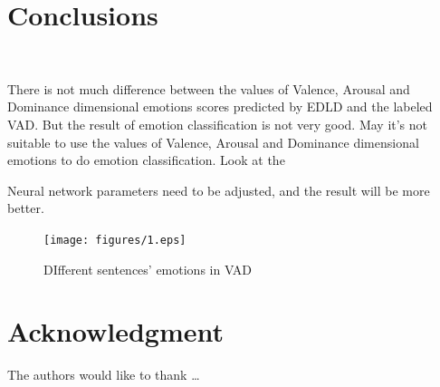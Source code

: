 
\section{Conclusions} \label{sec-conclusions}
\
	
	There is not much difference between 
	the values of Valence, Arousal and Dominance 
	dimensional emotions scores predicted by EDLD
	and the labeled VAD.
	But the result of
	emotion classification is
	not very good.
	May it's not suitable to
	use the values of Valence, Arousal and Dominance 
	dimensional emotions to
	do emotion classification.
	Look at the 
	
	
	Neural network parameters need to be adjusted,
	and the result will be more better.

\begin{figure}[htbp]
	\centering
	\texttt{[image: figures/1.eps]}
	\caption{DIfferent sentences' emotions in VAD}\label{fig:1}
\end{figure}

\section*{Acknowledgment}

\lipsum[1]


The authors would like to thank \ldots

